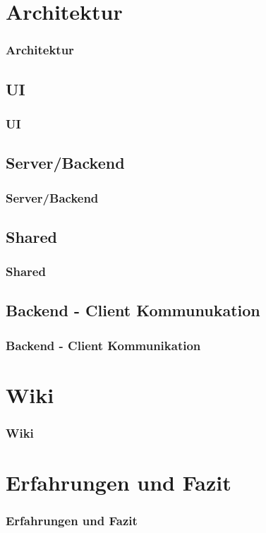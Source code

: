\documentclass{beamer}
\begin{document}
\section{Architektur}
\begin{frame}
\frametitle{Architektur}

\end{frame}

\subsection{UI}
\begin{frame}
\frametitle{UI}
\end{frame}

\subsection{Server/Backend}
\begin{frame}
\frametitle{Server/Backend}
\end{frame}

\subsection{Shared}
\begin{frame}
\frametitle{Shared}
\end{frame}

\subsection{Backend - Client Kommunukation}
\begin{frame}
\frametitle{Backend - Client Kommunikation}
\end{frame}

\section{Wiki}
\begin{frame}
\frametitle{Wiki}

\end{frame}

\section{Erfahrungen und Fazit}
\begin{frame}
\frametitle{Erfahrungen und Fazit}

\end{frame}
\end{document}
